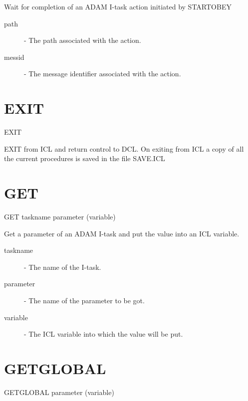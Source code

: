 \documentclass[twoside,11pt,nolof,chapters]{starlink}
\begin{document}
 Wait for completion of an ADAM I-task action initiated by STARTOBEY

\begin{description}

\item[path]  -  The path associated with the action.

\item[messid]  -  The message identifier associated with the action.

\end{description}

\section{EXIT\label{EXIT}}

   EXIT

 EXIT from ICL and return control to DCL. On exiting from ICL a
 copy of all the current procedures is saved in the file SAVE.ICL

\section{GET\label{GET}}

   GET \hspace{.5cm} taskname \hspace{.5cm} parameter \hspace{.5cm} (variable)

 Get a parameter of an ADAM I-task and put the value into an ICL variable.

\begin{description}

\item[taskname] - The name of the I-task.

\item[parameter] - The name of the parameter to be got.

\item[variable] - The ICL variable into which the value will be put.

\end{description}


\section{GETGLOBAL\label{GETGLOBAL}}

   GETGLOBAL \hspace{.5cm}  parameter \hspace{.5cm} (variable)
\end{document}
